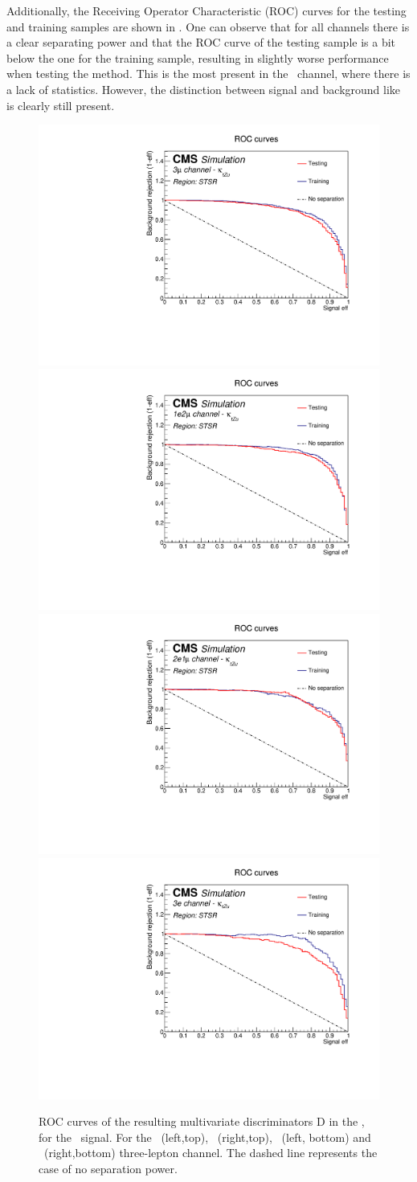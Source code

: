 Additionally, the Receiving Operator Characteristic (ROC) curves for the testing and training samples are shown in . One can observe that for all channels there is a clear separating power and that the ROC curve of the testing sample is a bit below the one for the training sample, resulting in slightly worse performance when testing the method. This is the most present in the \eee\ channel, where there is a lack of statistics. However, the distinction between signal and background like is clearly still present.
\begin{figure}[htbp]
	\centering
	\includegraphics[width=0.49\linewidth]{6_Search/Figures/PlotsTechnics/ROCZutsingletopuuu}
	\includegraphics[width=0.49\linewidth]{6_Search/Figures/PlotsTechnics/ROCZutsingletopuue}
	\includegraphics[width=0.49\linewidth]{6_Search/Figures/PlotsTechnics/ROCZutsingletopeeu}
	\includegraphics[width=0.49\linewidth]{6_Search/Figures/PlotsTechnics/ROCZutsingletopeee}
	\caption{ROC curves of the resulting  multivariate discriminators D in the \STSR, for the \Zut\ signal. For the \mumumu\ (left,top), \emumu\ (right,top), \eemu\ (left, bottom) and \eee\ (right,bottom) three-lepton channel. The dashed line represents the case of no separation power.}
	\label{fig:roczutsingletop}
\end{figure}




